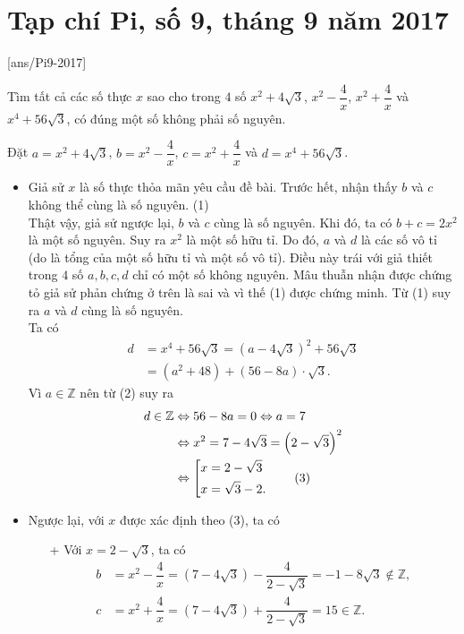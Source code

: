 \section{Tạp chí Pi, số 9,  tháng 9 năm 2017}
[ans/Pi9-2017]
\begin{bt}%
	Tìm tất cả các số thực $x$ sao cho trong $4$ số $x^2+4\sqrt{3}$, $x^2-\dfrac{4}{x}$, $x^2+\dfrac{4}{x}$ và $x^4+56\sqrt{3}$, có đúng một số không phải số nguyên.
	\loigiai
	{
		Đặt $a=x^2+4\sqrt{3}$, $b=x^2-\dfrac{4}{x}$, $c=x^2+\dfrac{4}{x}$ và $d=x^4+56\sqrt{3}$.
		\begin{itemize}
			\item Giả sử $x$ là số thực thỏa mãn yêu cầu đề bài. Trước hết, nhận thấy $b$ và $c$ không thể cùng là số nguyên. \hfill (1)\\
			Thật vậy, giả sử ngược lại, $b$ và $c$ cùng là số nguyên. Khi đó, ta có $b+c=2x^2$ là một số nguyên. Suy ra $x^2$ là một số hữu tỉ. Do đó, $a$ và $d$ là các số vô tỉ (do là tổng của một số hữu tỉ và một số vô tỉ). Điều này trái với giả thiết trong $4$ số $a,b,c,d$ chỉ có một số không nguyên. Mâu thuẫn nhận được chứng tỏ giả sử phản chứng ở trên là sai và vì thế (1) được chứng minh. Từ (1) suy ra $a$ và $d$ cùng là số nguyên.\\
			Ta có
			\begin{align*}
				d & = x^4+56\sqrt{3}=\left(a-4\sqrt{3}\right)^2+56\sqrt{3}\\
				& = \left(a^2+48\right)+(56-8a)\cdot\sqrt{3}.\tag{2}
			\end{align*}
			Vì $a\in\mathbb{Z}$ nên từ (2) suy ra
			\begin{align*}
				d\in\mathbb{Z} & \Leftrightarrow 56-8a=0\Leftrightarrow a=7\\
				& \Leftrightarrow x^2=7-4\sqrt{3}=\left(2-\sqrt{3}\right)^2\\
				& \Leftrightarrow \left[\begin{aligned}& x=2-\sqrt{3}\\& x=\sqrt{3}-2.\end{aligned}\right.\tag{3}
			\end{align*}
			\item Ngược lại, với $x$ được xác định theo (3), ta có
			\begin{itemize}
				\item[+] Với $x=2-\sqrt{3}$, ta có
				\begin{align*}
					b & =x^2-\dfrac{4}{x}=\left(7-4\sqrt{3}\right)-\dfrac{4}{2-\sqrt{3}} =-1-8\sqrt{3}\notin\mathbb{Z},\\
					c & =x^2+\dfrac{4}{x}=\left(7-4\sqrt{3}\right)+\dfrac{4}{2-\sqrt{3}}=15\in\mathbb{Z}.

\end{align*}
\end{itemize}
\end{itemize}}
\end{bt}
